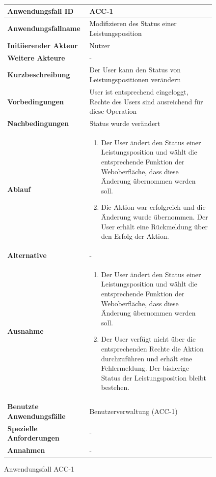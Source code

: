 \newpage

\begin{figure}[h]
	\centering
	\begin{tabularx}{\textwidth}{ X | X }
		\textbf{Anwendungsfall ID} & ACC-1 \\ \hline
		\textbf{Anwendungsfallname} & Modifizieren des Status einer Leistungsposition \\ \hline
		\textbf{Initiierender Akteur} & Nutzer \\ \hline
		\textbf{Weitere Akteure} & -  \\ \hline
		\textbf{Kurzbeschreibung} & Der User kann den Status von Leistungspositionen ver\"andern \\ \hline
		\textbf{Vorbedingungen} & User ist entsprechend eingeloggt, Rechte des Users sind ausreichend f\"ur diese Operation \\ \hline
		\textbf{Nachbedingungen} & Status wurde ver\"andert \\ \hline
		\textbf{Ablauf} &
		\begin{enumerate}
			\item Der User \"andert den Status einer Leistungsposition und w\"ahlt die entsprechende Funktion der Weboberfl\"ache, dass diese \"Anderung \"ubernommen werden soll.
			\item Die Aktion war erfolgreich und die \"Anderung wurde \"ubernommen.  Der User erh\"alt eine R\"uckmeldung \"uber den Erfolg der Aktion.
		\end{enumerate} \\ \hline
		\textbf{Alternative} & -
		\\ \hline
		\textbf{Ausnahme} &
		\begin{enumerate}
			\item Der User \"andert den Status einer Leistungsposition und w\"ahlt die entsprechende Funktion der Weboberfl\"ache,  dass diese \"Anderung \"ubernommen werden soll.
			\item Der User verf\"ugt nicht \"uber die entsprechenden Rechte die Aktion durchzuf\"uhren und erh\"alt eine Fehlermeldung. Der bisherige Status der Leistungsposition bleibt bestehen.
		\end{enumerate}  \\ \hline
		\textbf{Benutzte Anwendungsfälle} & Benutzerverwaltung (ACC-1) \\ \hline
		\textbf{Spezielle Anforderungen} & - \\ \hline
		\textbf{Annahmen} & -
	\end{tabularx}
	\caption{Anwendungsfall ACC-1}
	\label{fig:anwendungsfall-server-tabelle-ACC-1}
\end{figure}

